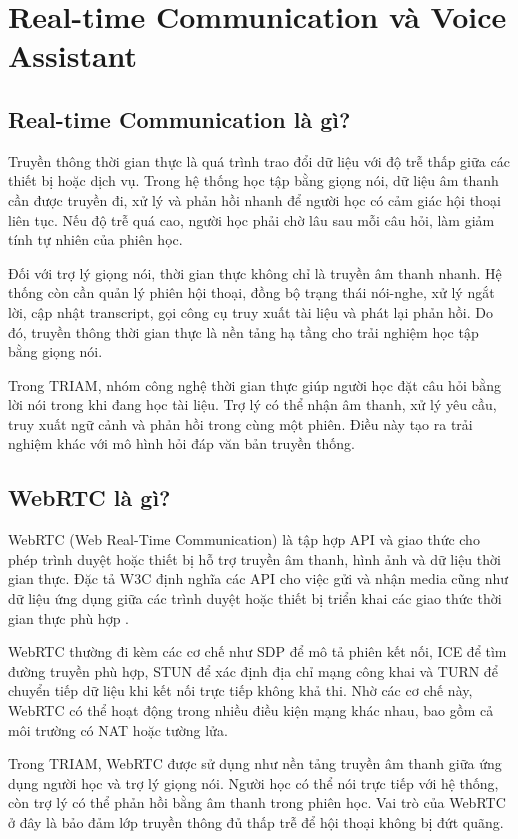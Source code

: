 \documentclass[12pt,a4paper]{report}
\begin{document}
\section{Real-time Communication và Voice Assistant}

\subsection{Real-time Communication là gì?}

Truyền thông thời gian thực là quá trình trao đổi dữ liệu với độ trễ thấp giữa các thiết bị hoặc dịch vụ. Trong hệ thống học tập bằng giọng nói, dữ liệu âm thanh cần được truyền đi, xử lý và phản hồi nhanh để người học có cảm giác hội thoại liên tục. Nếu độ trễ quá cao, người học phải chờ lâu sau mỗi câu hỏi, làm giảm tính tự nhiên của phiên học.

Đối với trợ lý giọng nói, thời gian thực không chỉ là truyền âm thanh nhanh. Hệ thống còn cần quản lý phiên hội thoại, đồng bộ trạng thái nói-nghe, xử lý ngắt lời, cập nhật transcript, gọi công cụ truy xuất tài liệu và phát lại phản hồi. Do đó, truyền thông thời gian thực là nền tảng hạ tầng cho trải nghiệm học tập bằng giọng nói.

Trong TRIAM, nhóm công nghệ thời gian thực giúp người học đặt câu hỏi bằng lời nói trong khi đang học tài liệu. Trợ lý có thể nhận âm thanh, xử lý yêu cầu, truy xuất ngữ cảnh và phản hồi trong cùng một phiên. Điều này tạo ra trải nghiệm khác với mô hình hỏi đáp văn bản truyền thống.

\subsection{WebRTC là gì?}

WebRTC (Web Real-Time Communication) là tập hợp API và giao thức cho phép trình duyệt hoặc thiết bị hỗ trợ truyền âm thanh, hình ảnh và dữ liệu thời gian thực. Đặc tả W3C định nghĩa các API cho việc gửi và nhận media cũng như dữ liệu ứng dụng giữa các trình duyệt hoặc thiết bị triển khai các giao thức thời gian thực phù hợp \cite{w3cWebrtc}.

WebRTC thường đi kèm các cơ chế như SDP để mô tả phiên kết nối, ICE để tìm đường truyền phù hợp, STUN để xác định địa chỉ mạng công khai và TURN để chuyển tiếp dữ liệu khi kết nối trực tiếp không khả thi. Nhờ các cơ chế này, WebRTC có thể hoạt động trong nhiều điều kiện mạng khác nhau, bao gồm cả môi trường có NAT hoặc tường lửa.

Trong TRIAM, WebRTC được sử dụng như nền tảng truyền âm thanh giữa ứng dụng người học và trợ lý giọng nói. Người học có thể nói trực tiếp với hệ thống, còn trợ lý có thể phản hồi bằng âm thanh trong phiên học. Vai trò của WebRTC ở đây là bảo đảm lớp truyền thông đủ thấp trễ để hội thoại không bị đứt quãng.
\end{document}
